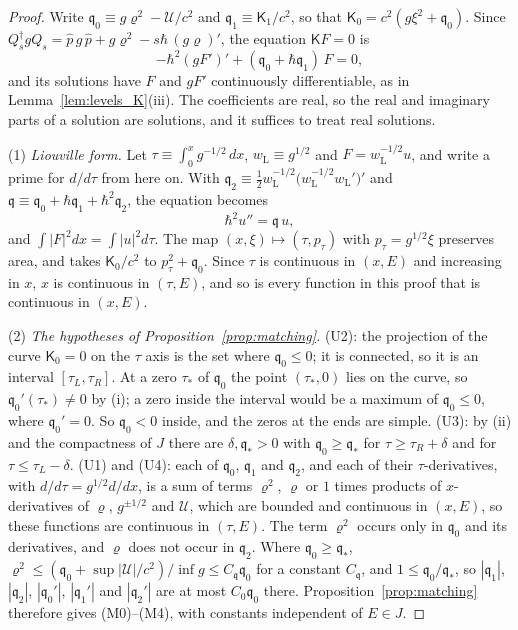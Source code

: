 \documentclass[aps,prd,onecolumn,tightenlines,nofootinbib,notitlepage,11pt,floatfix]{revtex4-2}
\theoremstyle{indentedtheorem}
\begin{document}
\begin{proof}
Write $\mathfrak{q}_0\equiv g\varrho^2-\mathcal{U}/c^2$ and $\mathfrak{q}_1\equiv\mathsf{K}_1/c^2$, so that $\mathsf{K}_0=c^2(g\xi^2+\mathfrak{q}_0)$. Since $Q_s^\dagger gQ_s=\hat{p}\,g\,\hat{p}+g\varrho^2-s\hbar\,(g\varrho)'$, the equation $\mathsf{K}F=0$ is
\begin{equation*}
    -\hbar^2(gF')'+(\mathfrak{q}_0+\hbar\mathfrak{q}_1)\,F = 0 ,
\end{equation*}
and its solutions have $F$ and $gF'$ continuously differentiable, as in Lemma~\ref{lem:levels_K}(iii). The coefficients are real, so the real and imaginary parts of a solution are solutions, and it suffices to treat real solutions.

(1) \emph{Liouville form.} Let $\tau\equiv\int_0^xg^{-1/2}\,dx$, $w_\text{L}\equiv g^{1/2}$ and $F=w_\text{L}^{-1/2}u$, and write a prime for $d/d\tau$ from here on. With $\mathfrak{q}_2\equiv\tfrac{1}{2}w_\text{L}^{-1/2}\big(w_\text{L}^{-1/2}w_\text{L}'\big)'$ and $\mathfrak{q}\equiv\mathfrak{q}_0+\hbar\mathfrak{q}_1+\hbar^2\mathfrak{q}_2$, the equation becomes
\begin{equation*}
    \hbar^2u'' = \mathfrak{q}\,u ,
\end{equation*}
and $\int|F|^2dx=\int|u|^2d\tau$. The map $(x,\xi)\mapsto(\tau,p_\tau)$ with $p_\tau=g^{1/2}\xi$ preserves area, and takes $\mathsf{K}_0/c^2$ to $p_\tau^2+\mathfrak{q}_0$. Since $\tau$ is continuous in $(x,E)$ and increasing in $x$, $x$ is continuous in $(\tau,E)$, and so is every function in this proof that is continuous in $(x,E)$.

(2) \emph{The hypotheses of Proposition~\ref{prop:matching}.} (U2): the projection of the curve $\mathsf{K}_0=0$ on the $\tau$ axis is the set where $\mathfrak{q}_0\leq0$; it is connected, so it is an interval $[\tau_L,\tau_R]$. At a zero $\tau_*$ of $\mathfrak{q}_0$ the point $(\tau_*,0)$ lies on the curve, so $\mathfrak{q}_0'(\tau_*)\neq0$ by (i); a zero inside the interval would be a maximum of $\mathfrak{q}_0\leq0$, where $\mathfrak{q}_0'=0$. So $\mathfrak{q}_0<0$ inside, and the zeros at the ends are simple. (U3): by (ii) and the compactness of $J$ there are $\delta,\mathfrak{q}_*>0$ with $\mathfrak{q}_0\geq\mathfrak{q}_*$ for $\tau\geq\tau_R+\delta$ and for $\tau\leq\tau_L-\delta$. (U1) and (U4): each of $\mathfrak{q}_0$, $\mathfrak{q}_1$ and $\mathfrak{q}_2$, and each of their $\tau$-derivatives, with $d/d\tau=g^{1/2}d/dx$, is a sum of terms $\varrho^2$, $\varrho$ or $1$ times products of $x$-derivatives of $\varrho$, $g^{\pm1/2}$ and $\mathcal{U}$, which are bounded and continuous in $(x,E)$, so these functions are continuous in $(\tau,E)$. The term $\varrho^2$ occurs only in $\mathfrak{q}_0$ and its derivatives, and $\varrho$ does not occur in $\mathfrak{q}_2$. Where $\mathfrak{q}_0\geq\mathfrak{q}_*$, $\varrho^2\leq(\mathfrak{q}_0+\sup|\mathcal{U}|/c^2)/\inf g\leq C_\mathfrak{q}\mathfrak{q}_0$ for a constant $C_\mathfrak{q}$, and $1\leq\mathfrak{q}_0/\mathfrak{q}_*$, so $|\mathfrak{q}_1|$, $|\mathfrak{q}_2|$, $|\mathfrak{q}_0'|$, $|\mathfrak{q}_1'|$ and $|\mathfrak{q}_2'|$ are at most $C_0\mathfrak{q}_0$ there. Proposition~\ref{prop:matching} therefore gives (M0)--(M4), with constants independent of $E\in J$.


\end{proof}
\end{document}
